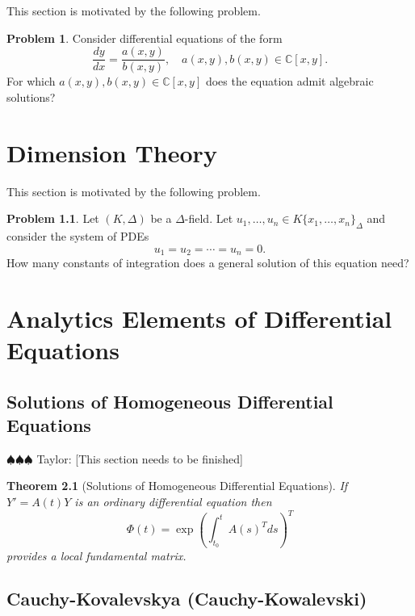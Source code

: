 \documentclass[12pt]{book}
\newcommand{\taylor}[1]{{\color{blue} \sf $\spadesuit\spadesuit\spadesuit$ Taylor: [#1]}}
\numberwithin{equation}{section}
\newtheorem{theorem}{Theorem}[subsection]
\theoremstyle{definition}
\newtheorem{problem}[theorem]{Problem}
\theoremstyle{remark}
\newcommand{\CC}{\mathbb{C}}
\begin{document}
This section is motivated by the following problem.
\begin{problem}
	Consider differential equations of the form
	 $$ \dfrac{dy}{dx} = \frac{a(x,y)}{b(x,y)}, \quad a(x,y),b(x,y) \in \CC[x,y].$$
	 For which $a(x,y),b(x,y) \in \CC[x,y]$ does the equation admit algebraic solutions?
\end{problem}


\chapter[Dimension Theory]{Dimension Theory}\label{S:dimension-theory}

This section is motivated by the following problem.
\begin{problem}
	Let $(K,\Delta)$ be a $\Delta$-field. 
	Let $u_1,\ldots,u_n \in K\lbrace x_1,\ldots,x_n\rbrace_{\Delta}$ and consider the system of PDEs
	 $$ u_1=u_2=\cdots=u_n=0. $$
	How many constants of integration does a general solution of this equation need?
\end{problem}

\appendix 
\chapter[Analytic Elements]{Analytics Elements of Differential Equations}

\section{Solutions of Homogeneous Differential Equations}
\taylor{This section needs to be finished}

\begin{theorem}[Solutions of Homogeneous Differential Equations]
	If $Y'= A(t)Y$ is an ordinary differential equation then 
	 $$ \Phi(t) = \exp( \int_{t_0}^t A(s)^T ds )^T $$
	provides a local fundamental matrix. 
\end{theorem}



\section{Cauchy-Kovalevskya (Cauchy-Kowalevski)}

\backmatter





\end{document}
